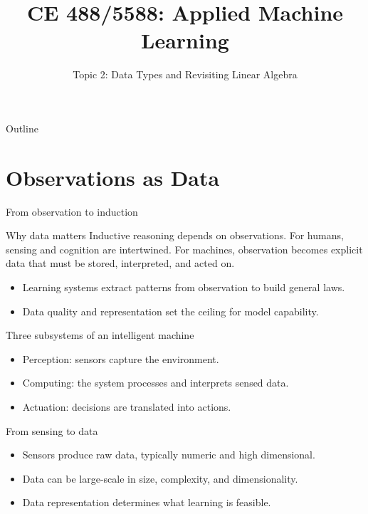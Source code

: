 \documentclass[12pt]{beamer}
\title{CE 488/5588: Applied Machine Learning}
\subtitle{Topic 2: Data Types and Revisiting Linear Algebra}
\author{}
\date{}
\begin{document}
\begin{frame}
  \titlepage
\end{frame}

\begin{frame}{Outline}
  \tableofcontents
\end{frame}

\section{Observations as Data}

\begin{frame}{From observation to induction}
  \begin{conceptbox}{Why data matters}
    Inductive reasoning depends on observations. For humans, sensing and cognition are intertwined.
    For machines, observation becomes explicit data that must be stored, interpreted, and acted on.
  \end{conceptbox}
  \begin{itemize}
    \item Learning systems extract patterns from observation to build general laws.
    \item Data quality and representation set the ceiling for model capability.
  \end{itemize}
\end{frame}

\begin{frame}{Three subsystems of an intelligent machine}
  \begin{itemize}
    \item Perception: sensors capture the environment.
    \item Computing: the system processes and interprets sensed data.
    \item Actuation: decisions are translated into actions.
  \end{itemize}
\end{frame}

\begin{frame}{From sensing to data}
  \begin{itemize}
    \item Sensors produce raw data, typically numeric and high dimensional.
    \item Data can be large-scale in size, complexity, and dimensionality.
    \item Data representation determines what learning is feasible.
  \end{itemize}
\end{frame}
\end{document}
